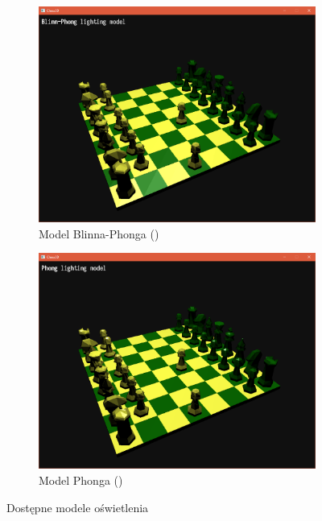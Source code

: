 \documentclass[10pt,a4paper]{article}
\begin{document}
\begin{figure}[H]
	\centering
	\begin{subfigure}[b]{0.45\textwidth}
		\includegraphics[width=\textwidth]{screenshots/06_blinn-phong.png}
		\caption{Model Blinna-Phonga ()}
	\end{subfigure}
	\begin{subfigure}[b]{0.45\textwidth}
		\includegraphics[width=\textwidth]{screenshots/07_phong.png}
		\caption{Model Phonga ()}
	\end{subfigure}
	\caption{Dostępne modele oświetlenia}
\end{figure}
\end{document}
